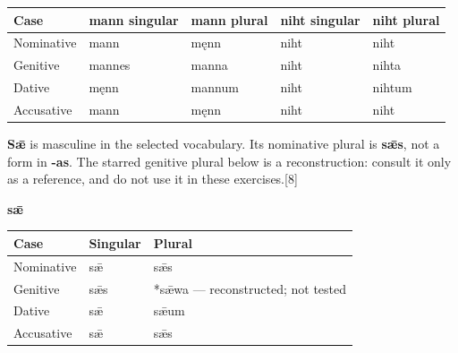 \par\begingroup
\fontsize{10.5}{13.2}\selectfont
\setlength{\LTleft}{0pt}\setlength{\LTright}{\fill}
\noindent
\begin{tabular}{@{}>{\raggedright\arraybackslash}p{22.0mm}>{\raggedright\arraybackslash}p{22.688mm}>{\raggedright\arraybackslash}p{22.688mm}>{\raggedright\arraybackslash}p{22.688mm}>{\raggedright\arraybackslash}p{22.688mm}@{}}
\toprule
\textbf{Case} & \textbf{mann singular} & \textbf{mann plural} & \textbf{niht singular} & \textbf{niht plural} \\
\midrule
Nominative & mann & męnn & niht & niht \\
Genitive & mannes & manna & niht & nihta \\
Dative & męnn & mannum & niht & nihtum \\
Accusative & mann & męnn & niht & niht \\
\bottomrule
\end{tabular}
\par\endgroup

\textbf{Sǣ} is masculine in the selected vocabulary. Its nominative plural is \textbf{sǣs}, not a form in \textbf{-as}. The starred genitive plural below is a reconstruction: consult it only as a reference, and do not use it in these exercises.[8]

\textbf{sǣ}\par\nobreak

\par\begingroup
\fontsize{10.5}{13.2}\selectfont
\setlength{\LTleft}{0pt}\setlength{\LTright}{\fill}
\noindent
\begin{tabular}{@{}>{\raggedright\arraybackslash}p{39.459mm}>{\raggedright\arraybackslash}p{39.459mm}>{\raggedright\arraybackslash}p{39.459mm}@{}}
\toprule
\textbf{Case} & \textbf{Singular} & \textbf{Plural} \\
\midrule
Nominative & sǣ & sǣs \\
Genitive & sǣs & *sǣwa — reconstructed; not tested \\
Dative & sǣ & sǣum \\
Accusative & sǣ & sǣs \\
\bottomrule
\end{tabular}
\par\endgroup

